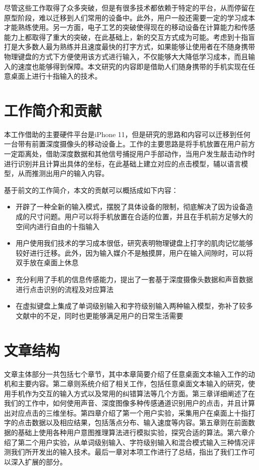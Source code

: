尽管这些工作取得了众多突破，但是有很多技术都依赖于特定的平台，从而停留在原型阶段，难以迁移到人们常用的设备中。此外，用户一般还需要一定的学习成本才能熟练使用。另一方面，电子工艺的突破使得现在的移动设备在计算能力和传感能力上都取得了重大的突破，在此基础上，新的交互方式成为可能。考虑到十指盲打是大多数人最为熟练并且速度最快的打字方式，如果能够让使用者在不随身携带物理键盘的方式下方便使用该方式进行输入，不仅能够大大降低学习成本，而且输入的速度也能够得到保障。本文研究的内容即是借助人们随身携带的手机实现在任意桌面上进行十指输入的技术。

\section{工作简介和贡献}
本工作借助的主要硬件平台是iPhone 11，但是研究的思路和内容可以迁移到任何一台带有前置深度摄像头的移动设备上。工作的主要思路是将手机放置在用户前方一定距离处，借助深度数据和其他信号捕捉用户手部动作，当用户发生敲击动作时进行识别并且计算出具体的坐标，在此基础上建立对应的点击模型，辅以语言模型，从而推测出用户的输入内容。

基于前文的工作简介，本文的贡献可以概括成如下内容：
\begin{itemize}
    \item 开辟了一种全新的输入模式，摆脱了具体设备的限制，彻底解决了因为设备造成的尺寸问题。用户可以将手机放置在合适的位置，并且在手机前方足够大的空间内进行自由的十指输入
    \item 用户使用我们技术的学习成本很低，研究表明物理键盘上打字的肌肉记忆能够较好进行迁移\cite{palmboard2020}\cite{2018shitoast}。此外，因为输入媒介不是触摸屏，用户在输入间隙时，可以将双手放在桌面上休息
    \item 充分利用了手机的信息传感能力，提出了一套基于深度摄像头数据和声音数据进行点击识别的流程及对应算法
    \item 在虚拟键盘上集成了单词级别输入和字符级别输入两种输入模型，弥补了较多文献中的不足，同时也更能够满足用户的日常生活需要
\end{itemize}

\section{文章结构}
文章主体部分一共包括七个章节，其中本章简要介绍了任意桌面文本输入工作的动机和主要内容。第二章则系统介绍了相关工作，包括任意桌面文本输入的研究，使用手机作为交互的输入方式以及常用的纠错算法等几个方面。第三章详细阐述了在我们的工作中，如何使用声音、深度图像多种传感通道识别用户的点击，并且计算出对应点击的三维坐标。第四章介绍了第一个用户实验，采集用户在桌面上十指打字的点击数据以及相应结果，包括落点分布、输入速度等内容。第五章则在前面数据的基础上使用各种用户意图推理算法进行模拟实验，探究合适的算法。第六章介绍了第二个用户实验，从单词级别输入、字符级别输入和混合模式输入三种情况评测我们所开发出的输入技术。最后一章对本项工作进行了总结，指出了我们工作可以深入扩展的部分。